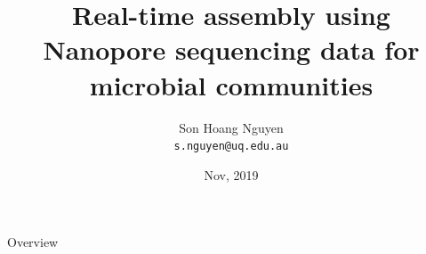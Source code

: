 \documentclass{beamer}
\title[Real-time assembly \& analysis for microbial genomes]
{
Real-time assembly using Nanopore sequencing data for microbial communities
}
\author[Son Hoang Nguyen, The University of Queensland]{Son Hoang Nguyen \\ \footnotesize{\texttt{s.nguyen@uq.edu.au}}
}
\date{Nov, 2019}
\institute[IMB,UQ]{\large{Institute for Molecular Bioscience \\ The University of Queensland}}
\begin{document}
\begin{frame}
   \titlepage
\end{frame}
\begin{frame}{Overview}
 \tableofcontents
\end{frame}
%
\end{document}
